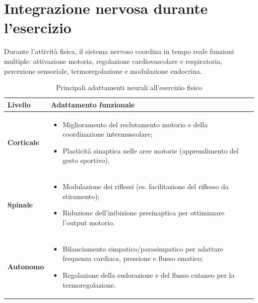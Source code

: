 \documentclass[11pt,a4paper,italian,twoside]{report}
\theoremstyle{definition} %
\begin{document}
\section{Integrazione nervosa durante l'esercizio}
\label{sec:esercizio_sn}

\begin{concetto}
Durante l'attività fisica, il sistema nervoso coordina in tempo reale funzioni multiple: attivazione motoria, regolazione cardiovascolare e respiratoria, percezione sensoriale, termoregolazione e modulazione endocrina.
\end{concetto}

\begin{table}[htbp]
  \centering
  \caption{Principali adattamenti neurali all'esercizio fisico}
  \label{tab:adattamenti_neurali}
  \begin{tabularx}{\textwidth}{l X}
    \toprule
    \textbf{Livello} & \textbf{Adattamento funzionale} \\
    \midrule
    \textbf{Corticale} & 
    \begin{itemize}[leftmargin=1.2em,noitemsep,topsep=0pt,partopsep=0pt]
      \item Miglioramento del reclutamento motorio e della coordinazione intermuscolare;
      \item Plasticità sinaptica nelle aree motorie (apprendimento del gesto sportivo).
    \end{itemize} \\
    \addlinespace
    \textbf{Spinale} & 
    \begin{itemize}[leftmargin=1.2em,noitemsep,topsep=0pt,partopsep=0pt]
      \item Modulazione dei riflessi (es. facilitazione del riflesso da stiramento);
      \item Riduzione dell'inibizione presinaptica per ottimizzare l'output motorio.
    \end{itemize} \\
    \addlinespace
    \textbf{Autonomo} & 
    \begin{itemize}[leftmargin=1.2em,noitemsep,topsep=0pt,partopsep=0pt]
      \item Bilanciamento simpatico/parasimpatico per adattare frequenza cardiaca, pressione e flusso ematico;
      \item Regolazione della sudorazione e del flusso cutaneo per la termoregolazione.
    \end{itemize} \\
    \bottomrule
  \end{tabularx}
\end{table}
\end{document}
